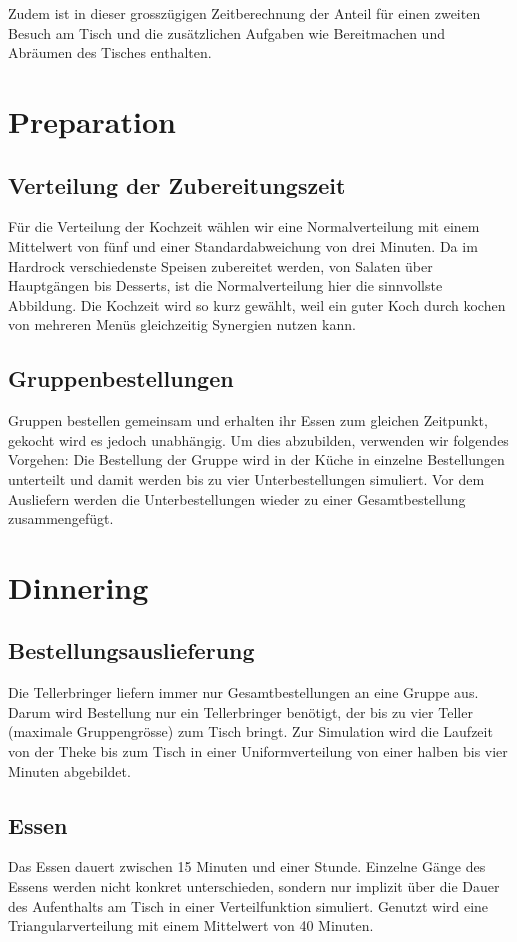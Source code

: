 \documentclass[ngerman,a4paper,12pt]{scrreprt}
\begin{document}
			Zudem ist in dieser grosszügigen Zeitberechnung der Anteil für einen zweiten Besuch am Tisch und die zusätzlichen Aufgaben wie Bereitmachen und Abräumen des Tisches enthalten.
	
	
	\section{Preparation}	
		\subsection{Verteilung der Zubereitungszeit}
			Für die Verteilung der Kochzeit wählen wir eine Normalverteilung mit einem Mittelwert von fünf und einer Standardabweichung von drei Minuten. Da im Hardrock verschiedenste Speisen zubereitet werden, von Salaten über Hauptgängen bis Desserts, ist die Normalverteilung hier die sinnvollste Abbildung. Die Kochzeit wird so kurz gewählt, weil ein guter Koch durch kochen von mehreren Menüs gleichzeitig Synergien nutzen kann.
	
	
		\subsection{Gruppenbestellungen}
			Gruppen bestellen gemeinsam und erhalten ihr Essen zum gleichen Zeitpunkt, gekocht wird es jedoch unabhängig. Um dies abzubilden, verwenden wir folgendes Vorgehen: Die Bestellung der Gruppe wird in der Küche in einzelne Bestellungen unterteilt und damit werden bis zu vier Unterbestellungen simuliert. Vor dem Ausliefern werden die Unterbestellungen wieder zu einer Gesamtbestellung zusammengefügt.
			
			
	\section{Dinnering}
		\subsection{Bestellungsauslieferung}					
			Die Tellerbringer liefern immer nur Gesamtbestellungen an eine Gruppe aus. Darum wird Bestellung nur ein Tellerbringer benötigt, der bis zu vier Teller (maximale Gruppengrösse) zum Tisch bringt. Zur Simulation wird die Laufzeit von der Theke bis zum Tisch in einer Uniformverteilung von einer halben bis vier Minuten abgebildet.


		\subsection{Essen}
			Das Essen dauert zwischen 15 Minuten und einer Stunde. Einzelne Gänge des Essens werden nicht konkret unterschieden, sondern nur implizit über die Dauer des Aufenthalts am Tisch in einer Verteilfunktion simuliert. Genutzt wird eine Triangularverteilung mit einem Mittelwert von 40 Minuten.\\
			
\end{document}
